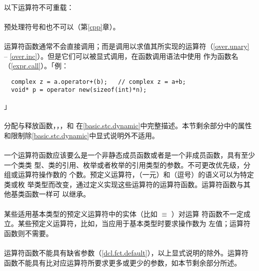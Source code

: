 \paragraph{}
以下运算符不可重载：                                                          \\
\mbox{}                           \\
预处理符号\tm{\#}和\tm{\#\#}也不可以（第\ref{cpp}章）。

\paragraph{}
运算符函数通常不会直接调用；而是调用以求值其所实现的运算符（\ref{over.unary} --
\ref{over.inc}）。但是它们可以被显式调用，在函数调用语法中使用
作为函数名（\ref{expr.call}）。「例：
\begin{lstlisting}
  complex z = a.operator+(b);   // complex z = a+b;
  void* p = operator new(sizeof(int)*n);
\end{lstlisting}」

\paragraph{}
分配与释放函数，，，和
在\ref{basic.stc.dynamic}中完整描述。本节剩余部分中的属性
和限制除\ref{basic.stc.dynamic}中显式说明外不适用。

\paragraph{}
一个运算符函数应该要么是一个非静态成员函数或者是一个非成员函数，具有至少一个类类
型、类的引用、枚举或者枚举的引用类型的参数。不可更改优先级，分组或运算符操作数的
个数。预定义运算符\tm{=}，（一元）\tm{\&}和\tm{,}（逗号）的语义可以为特定类或枚
举类型而改变，通过定义实现这些运算符的运算符函数。运算符函数与其他基类函数一样可
以继承。

\paragraph{}
某些适用基本类型的预定义运算符中的实体（比如 $\equiv$ ）对运算
符函数不一定成立。某些预定义运算符，比如\tm{+=}，当应用于基本类型时要求操作数为
左值；运算符函数则不需要。

\paragraph{}
运算符函数不能具有缺省参数（\ref{dcl.fct.default}），以上显式说明的除外。运算符
函数不能具有比对应运算符所要求更多或更少的参数，如本节剩余部分所述。

